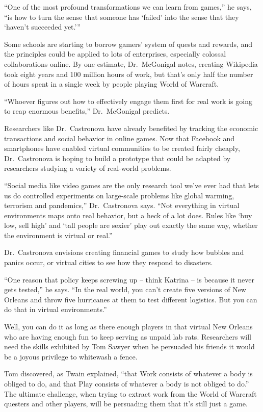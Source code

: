﻿\documentclass[12pt]{article}
\begin{document}
``One of the most profound transformations we can learn from games,'' he says, ``is how to turn the
sense that someone has `failed' into the sense that they `haven't succeeded yet.'''

Some schools are starting to borrow gamers' system of quests and rewards, and the principles could
be applied to lots of enterprises, especially colossal collaborations online. By one estimate,
Dr.~McGonigal notes, creating Wikipedia took eight years and 100 million hours of work, but that's
only half the number of hours spent in a single week by people playing World of Warcraft.

``Whoever figures out how to effectively engage them first for real work is going to reap enormous
benefits,'' Dr.~McGonigal predicts.

Researchers like Dr.~Castronova have already benefited by tracking the economic transactions and
social behavior in online games. Now that Facebook and smartphones have enabled virtual communities
to be created fairly cheaply, Dr.~Castronova is hoping to build a prototype that could be adapted by
researchers studying a variety of real-world problems.

``Social media like video games are the only research tool we've ever had that lets us do controlled
experiments on large-scale problems like global warming, terrorism and pandemics,'' Dr.~Castronova
says. ``Not everything in virtual environments maps onto real behavior, but a heck of a lot does.
Rules like `buy low, sell high' and `tall people are sexier' play out exactly the same way, whether
the environment is virtual or real.''

Dr.~Castronova envisions creating financial games to study how bubbles and panics occur, or virtual
cities to see how they respond to disasters.

``One reason that policy keeps screwing up -- think Katrina -- is because it never gets tested,'' he
says. ``In the real world, you can't create five versions of New Orleans and throw five hurricanes
at them to test different logistics. But you can do that in virtual environments.''

Well, you can do it as long as there enough players in that virtual New Orleans who are having
enough fun to keep serving as unpaid lab rats. Researchers will need the skills exhibited by Tom
Sawyer when he persuaded his friends it would be a joyous privilege to whitewash a fence.

Tom discovered, as Twain explained, ``that Work consists of whatever a body is obliged to do, and
that Play consists of whatever a body is not obliged to do.'' The ultimate challenge, when trying to
extract work from the World of Warcraft questers and other players, will be persuading them that
it's still just a game.
\end{document}
